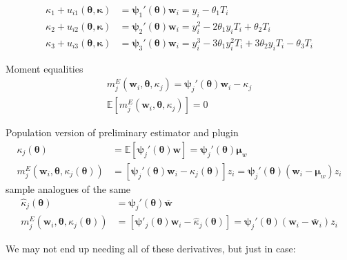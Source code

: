 \documentclass[12pt]{article}
\begin{document}
\begin{align*}
  \kappa_1 + u_{i1}(\boldsymbol{\theta}, \boldsymbol{\kappa}) &=  \boldsymbol{\psi}_1'(\boldsymbol{\theta}) \mathbf{w}_i  =  y_i - \theta_1 T_i \\
  \kappa_2 + u_{i2}(\boldsymbol{\theta}, \boldsymbol{\kappa}) &= \boldsymbol{\psi}_2'(\boldsymbol{\theta}) \mathbf{w}_i = y_i^2 - 2\theta_1 y_iT_i + \theta_2 T_i \\
  \kappa_3 + u_{i3}(\boldsymbol{\theta},\boldsymbol{\kappa}) &= \boldsymbol{\psi}_3'(\boldsymbol{\theta}) \mathbf{w}_i = y_i^3 - 3\theta_1 y^2_i T_i + 3 \theta_2 y_iT_i - \theta_3 T_i 
\end{align*}

\noindent Moment equalities
\begin{align*}
  m^E_j(\mathbf{w}_i, \boldsymbol{\theta}, \kappa_j) =  \boldsymbol{\psi}_j'(\boldsymbol{\theta}) \mathbf{w}_i - \kappa_j \\
  \mathbb{E}[m^E_j(\mathbf{w}_i, \boldsymbol{\theta}, \kappa_j) ] = 0
\end{align*}

\noindent Population version of preliminary estimator and plugin
\begin{align*}
  \kappa_j(\boldsymbol{\theta}) &= \mathbb{E}[\boldsymbol{\psi}_j'(\boldsymbol{\theta})\mathbf{w}] = \boldsymbol{\psi}_j'(\boldsymbol{\theta}) \boldsymbol{\mu}_w\\
m_j^E\left(\mathbf{w}_i, \boldsymbol{\theta}, \kappa_j(\boldsymbol{\theta})\right) &= \left[\boldsymbol{\psi}_j'(\boldsymbol{\theta}) \mathbf{w}_i - \kappa_j(\boldsymbol{\theta})\right] z_i = \boldsymbol{\psi}_j'(\boldsymbol{\theta}) (\mathbf{w}_i - \boldsymbol{\mu}_w)z_i
\end{align*}
sample analogues of the same
\begin{align*}
  \widehat{\kappa}_j(\boldsymbol{\theta}) &= \boldsymbol{\psi}_j'(\boldsymbol{\theta}) \bar{\mathbf{w}}\\ m_j^E\left(\mathbf{w}_i, \boldsymbol{\theta}, \kappa_j(\boldsymbol{\theta})\right) &= \left[ \boldsymbol{\psi}'_j(\boldsymbol{\theta}) \mathbf{w}_i - \widehat{\kappa}_j(\boldsymbol{\theta}) \right] =  \boldsymbol{\psi}_j'(\boldsymbol{\theta}) (\mathbf{w}_i - \bar{\mathbf{w}}_i) z_i
\end{align*}

\noindent We may not end up needing all of these derivatives, but just in case:
\end{document}
